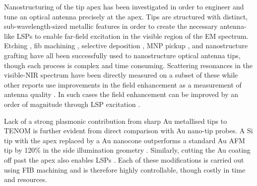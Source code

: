 \documentclass{article}
\begin{document}
Nanostructuring of the tip apex has been investigated in order to engineer and tune an optical antenna precisely at the apex. Tips are structured with distinct, sub-wavelength-sized metallic features in order to create the necessary antenna-like LSPs to enable far-field excitation in the visible region of the EM spectrum. Etching \cite{uebel2013, kharintsev2013}, \gls{fib} machining \cite{weber2010, fleischer2011, maouli2015}, selective deposition \cite{zou2009}, MNP pickup \cite{denisyuk2012}, and nanostructure grafting \cite{huth2013} have all been successfully used to nanostructure optical antenna tips, though each process is complex and time consuming. Scattering resonances in the visible-NIR spectrum have been directly measured on a subset of these \cite{zou2009, maouli2015} while other reports use improvements in the field enhancement as a measurement of antenna quality \cite{umakoshi2012, huth2013, kharintsev2013}. In such cases the field enhancement can be improved by an order of magnitude through LSP excitation \cite{weber2010, fleischer2011, umakoshi2012}.

Lack of a strong plasmonic contribution from sharp Au metallised tips to TENOM is further evident from direct comparison with Au nano-tip probes. A Si tip with the apex replaced by a Au nanocone outperforms a standard Au AFM tip by 120\% in the side illumination geometry \cite{huth2013}. Similarly, cutting the Au coating off past the apex also enables LSPs \cite{zou2009}. Each of these modifications is carried out using FIB machining and is therefore highly controllable, though costly in time and resources.
\end{document}
